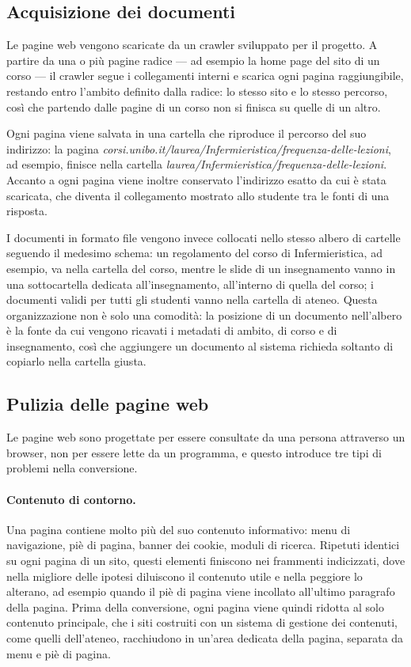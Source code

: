 \subsection{Acquisizione dei documenti}

Le pagine web vengono scaricate da un crawler sviluppato per il progetto. A partire da una o più pagine radice ---
ad esempio la home page del sito di un corso --- il crawler segue i collegamenti interni e scarica ogni pagina
raggiungibile, restando entro l'ambito definito dalla radice: lo stesso sito e lo stesso percorso, così che partendo
dalle pagine di un corso non si finisca su quelle di un altro.

Ogni pagina viene salvata in una cartella che riproduce il percorso del suo indirizzo: la pagina
\emph{corsi.unibo.it/laurea/Infermieristica/frequenza-delle-lezioni}, ad esempio, finisce nella cartella
\emph{laurea/Infermieristica/frequenza-delle-lezioni}. Accanto a ogni pagina viene inoltre conservato l'indirizzo esatto
da cui è stata scaricata, che diventa il collegamento mostrato allo studente tra le fonti di una risposta.

I documenti in formato file vengono invece collocati nello stesso albero di cartelle seguendo il medesimo schema:
un regolamento del corso di Infermieristica, ad esempio, va nella cartella del corso, mentre le slide di un
insegnamento vanno in una sottocartella dedicata all'insegnamento, all'interno di quella del corso; i documenti
validi per tutti gli studenti vanno nella cartella di ateneo. Questa organizzazione non è solo una comodità: la
posizione di un documento nell'albero è la fonte da cui vengono ricavati i metadati di ambito, di corso
e di insegnamento, così che aggiungere un documento al sistema richieda soltanto di
copiarlo nella cartella giusta.

\subsection{Pulizia delle pagine web}

Le pagine web sono progettate per essere consultate da una persona attraverso un browser, non per essere lette da
un programma, e questo introduce tre tipi di problemi nella conversione.

\paragraph{Contenuto di contorno.} Una pagina contiene molto più del suo contenuto informativo: menu di
navigazione, piè di pagina, banner dei cookie, moduli di ricerca. Ripetuti identici su ogni pagina di un sito,
questi elementi finiscono nei frammenti indicizzati, dove nella migliore delle ipotesi diluiscono il contenuto utile
e nella peggiore lo alterano, ad esempio quando il piè di pagina viene incollato all'ultimo paragrafo della pagina.
Prima della conversione, ogni pagina viene quindi ridotta al solo contenuto principale, che i siti costruiti con un
sistema di gestione dei contenuti, come quelli dell'ateneo, racchiudono in un'area dedicata della pagina, separata
da menu e piè di pagina.

